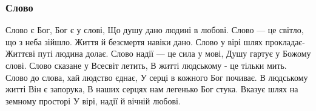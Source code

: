 
 
 

\subsubsection{Слово}
\label{sec:poetry.rus.sokor.slovo}

Слово є Бог, Бог є у слові,
Що душу дано людині в любові.
Слово --- це світло, що з неба зійшло.
Життя й безсмертя навіки дано.
Слово у вірі шлях прокладає-
Життєві путі людина долає.
Слово надії --- це сила у мові,
Душу гартує у Божому слові.
Слово сказане у Всесвіт летить,
В житті людському - це тільки мить.
Слово до слова, хай людство єднає,
У серці в кожного Бог почиває.
В людському житті Він є запорука,
В наших серцях нам легенько Бог стука.
Вказує шлях на земному просторі
У вірі, надії й вічній любові. 
